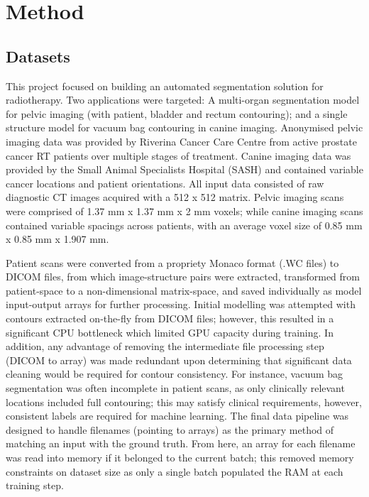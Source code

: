 \chapter{Method}
\label{ch:method}

\section{Datasets}
\label{ch:method-dataset}
This project focused on building an automated segmentation solution for radiotherapy. Two applications were targeted: A multi-organ segmentation model for pelvic imaging (with patient, bladder and rectum contouring); and a single structure model for vacuum bag contouring in canine imaging. Anonymised pelvic imaging data was provided by Riverina Cancer Care Centre from active prostate cancer RT patients over multiple stages of treatment. Canine imaging data was provided by the Small Animal Specialists Hospital (SASH) and contained variable cancer locations and patient orientations. All input data consisted of raw diagnostic CT images acquired with a 512 x 512 matrix. Pelvic imaging scans were comprised of 1.37 mm x 1.37 mm x 2 mm voxels; while canine imaging scans contained variable spacings across patients, with an average voxel size of 0.85 mm x 0.85 mm x 1.907 mm.

Patient scans were converted from a propriety Monaco format (.WC files) to DICOM files, from which image-structure pairs were extracted, transformed from patient-space to a non-dimensional matrix-space, and saved individually as model input-output arrays for further processing. Initial modelling was attempted with contours extracted on-the-fly from DICOM files; however, this resulted in a significant CPU bottleneck which limited GPU capacity during training. In addition, any advantage of removing the intermediate file processing step (DICOM to array) was made redundant upon determining that significant data cleaning would be required for contour consistency. For instance, vacuum bag segmentation was often incomplete in patient scans, as only clinically relevant locations included full contouring; this may satisfy clinical requirements, however, consistent labels are required for machine learning. The final data pipeline was designed to handle filenames (pointing to arrays) as the primary method of matching an input with the ground truth. From here, an array for each filename was read into memory if it belonged to the current batch; this removed memory constraints on dataset size as only a single batch populated the RAM at each training step.

